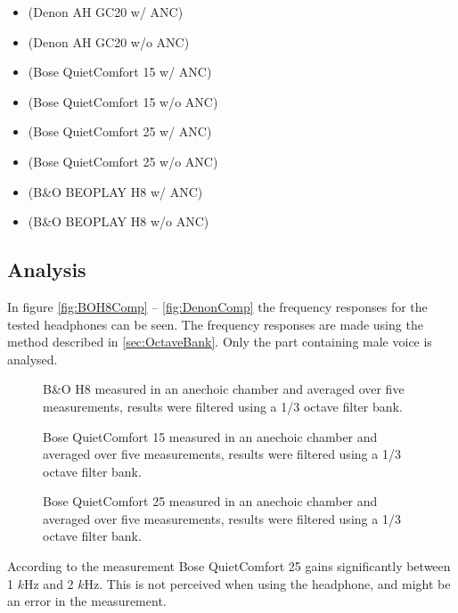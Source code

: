 \begin{itemize}
	\item {}			(Denon AH GC20 w/ ANC)
	\item {}		(Denon AH GC20 w/o ANC)
	\item {}		(Bose QuietComfort 15 w/ ANC)
	\item {}		(Bose QuietComfort 15 w/o ANC)
	\item {}		(Bose QuietComfort 25 w/ ANC)
	\item {}		(Bose QuietComfort 25 w/o ANC)
	\item {}			(B\&O BEOPLAY H8 w/ ANC)
	\item {}			(B\&O BEOPLAY H8 w/o ANC)
\end{itemize}


\subsection{Analysis}
In figure \autoref{fig:BOH8Comp} -- \autoref{fig:DenonComp} the frequency responses for the tested headphones can be seen. The frequency responses are made using the method described in \autoref{sec:OctaveBank}. Only the part containing male voice is analysed.

\begin{figure}[H]
	\centering
	
	\caption{B\&O H8 measured in an anechoic chamber and averaged over five measurements, results were filtered using a 1/3 octave filter bank.}
	\label{fig:BOH8Comp}
\end{figure}

\begin{figure}[H]	
	\centering
	
	\caption{Bose QuietComfort 15 measured in an anechoic chamber and averaged over five measurements, results were filtered using a 1/3 octave filter bank.}
	\label{fig:QC15Comp}
\end{figure}

\begin{figure}[H]
	\centering
	
	\caption{Bose QuietComfort 25 measured in an anechoic chamber and averaged over five measurements, results were filtered using a 1/3 octave filter bank.}
	\label{fig:QC25Comp}
\end{figure}
According to the measurement Bose QuietComfort 25 gains significantly between 1 $k$Hz and 2 $k$Hz. This is not perceived when using the headphone, and might be an error in the measurement. 

